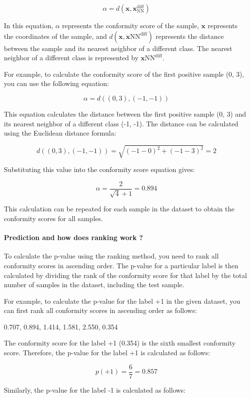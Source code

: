 $$ \alpha = d(\mathbf{x}, \mathbf{x}_\text{NN}^\text{diff}) $$

In this equation, $\alpha$ represents the conformity score of the sample, $\mathbf{x}$ represents the coordinates of the sample, and $d(\mathbf{x}, \mathbf{x}\text{NN}^\text{diff})$ represents the distance between the sample and its nearest neighbor of a different class. The nearest neighbor of a different class is represented by $\mathbf{x}\text{NN}^\text{diff}$.

For example, to calculate the conformity score of the first positive sample (0, 3), you can use the following equation:

$$ \alpha = d((0, 3), (-1, -1)) $$

This equation calculates the distance between the first positive sample (0, 3) and its nearest neighbor of a different class (-1, -1). The distance can be calculated using the Euclidean distance formula:

$$ d((0, 3), (-1, -1)) = \sqrt{(-1 - 0)^2 + (-1 - 3)^2} = 2 $$

Substituting this value into the conformity score equation gives:

$$ \alpha = \frac{2}{\sqrt{4} + 1} = 0.894 $$

This calculation can be repeated for each sample in the dataset to obtain the conformity scores for all samples.

\paragraph{Prediction and how does ranking work ? }
To calculate the p-value using the ranking method, you need to rank all conformity scores in ascending order. The p-value for a particular label is then calculated by dividing the rank of the conformity score for that label by the total number of samples in the dataset, including the test sample.

For example, to calculate the p-value for the label +1 in the given dataset, you can first rank all conformity scores in ascending order as follows:

0.707, 0.894, 1.414, 1.581, 2.550, 0.354

The conformity score for the label +1 (0.354) is the sixth smallest conformity score. Therefore, the p-value for the label +1 is calculated as follows:

$$ p(\text{+1}) = \frac{6}{7} = 0.857 $$

Similarly, the p-value for the label -1 is calculated as follows:

